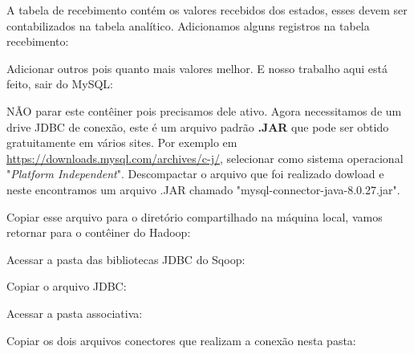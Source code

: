 \documentclass[a4paper,11pt]{article}
\begin{document}
A tabela de recebimento contém os valores recebidos dos estados, esses devem ser contabilizados na tabela analítico. Adicionamos alguns registros na tabela recebimento: \\

Adicionar outros pois quanto mais valores melhor. E nosso trabalho aqui está feito, sair do MySQL: \\

NÃO parar este contêiner pois precisamos dele ativo. Agora necessitamos de um drive JDBC de conexão, este é um arquivo padrão \textbf{.JAR} que pode ser obtido gratuitamente em vários sites. Por exemplo em \url{https://downloads.mysql.com/archives/c-j/}, selecionar como sistema operacional "\textit{Platform Independent}". Descompactar o arquivo que foi realizado dowload e neste encontramos um arquivo .JAR chamado "mysql-connector-java-8.0.27.jar".

Copiar esse arquivo para o diretório compartilhado na máquina local, vamos retornar para o contêiner do Hadoop: \\

Acessar a pasta das bibliotecas JDBC do Sqoop: \\

Copiar o arquivo JDBC: \\

Acessar a pasta associativa: \\

Copiar os dois arquivos conectores que realizam a conexão nesta pasta: \\
\end{document}
